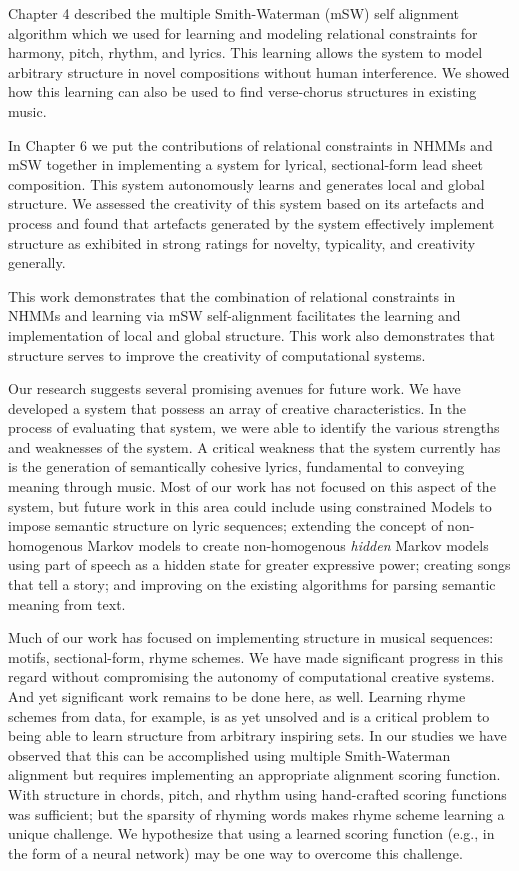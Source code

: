 \documentclass[phd,electronic,oneside,twosidetoc,letterpaper,chaptercenter,parttop,lol,lof,lot]{byumsphd}
\begin{document}
Chapter 4 described the multiple Smith-Waterman (mSW) self alignment algorithm which we used for learning and modeling relational constraints for harmony, pitch, rhythm, and lyrics. This learning allows the system to model arbitrary structure in novel compositions without human interference. We showed how this learning can also be used to find verse-chorus structures in existing music.

In Chapter 6 we put the contributions of relational constraints in NHMMs and mSW together in implementing a system for lyrical, sectional-form lead sheet composition. This system autonomously learns and generates local and global structure. We assessed the creativity of this system based on its artefacts and process and found that artefacts generated by the system effectively implement structure as exhibited in strong ratings for novelty, typicality, and creativity generally.

This work demonstrates that the combination of relational constraints in NHMMs and learning via mSW self-alignment facilitates the learning and implementation of local and global structure. This work also demonstrates that structure serves to improve the creativity of computational systems.

Our research suggests several promising avenues for future work. We have developed a system that possess an array of creative characteristics. In the process of evaluating that system, we were able to identify the various strengths and weaknesses of the system. A critical weakness that the system currently has is the generation of semantically cohesive lyrics, fundamental to conveying meaning through music. Most of our work has not focused on this aspect of the system, but future work in this area could include using constrained Models to impose semantic structure on lyric sequences; extending the concept of non-homogenous Markov models to create non-homogenous \emph{hidden} Markov models using part of speech as a hidden state for greater expressive power; creating songs that tell a story; and improving on the existing algorithms for parsing semantic meaning from text.

Much of our work has focused on implementing structure in musical sequences: motifs, sectional-form, rhyme schemes. We have made significant progress in this regard without compromising the autonomy of computational creative systems. And yet significant work remains to be done here, as well. Learning rhyme schemes from data, for example, is as yet unsolved and is a critical problem to being able to learn structure from arbitrary inspiring sets. In our studies we have observed that this can be accomplished using multiple Smith-Waterman alignment but requires implementing an appropriate alignment scoring function. With structure in chords, pitch, and rhythm using hand-crafted scoring functions was sufficient; but the sparsity of rhyming words makes rhyme scheme learning a unique challenge. We hypothesize that using a learned scoring function (e.g., in the form of a neural network) may be one way to overcome this challenge. 
\end{document}

